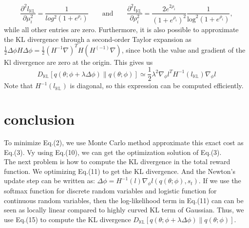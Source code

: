 \documentclass{article}
\begin{document}
	\begin{equation}
	\frac{\partial^2l_\mathds{KL}}{\partial\mu_i^2} = \frac{1}{log^2(1+e^{\rho_i})}\quad\quad\text{and}\quad\quad\frac{\partial^2l_\mathds{KL}}{\partial\rho_i^2} = \frac{2e^{2\rho_i}}{(1 + e^{\rho_i})^2}\frac{1}{\text{log}^2(1+e^{\rho_i})},
	\end{equation}
	while all other entries are zero. Furthermore, it is also possible to approximate the KL divergence through a second-order Taylor expansion as $\frac{1}{2}\Delta\phi H\Delta\phi=\frac{1}{2}(H^{-1}\nabla)^TH(H^(-1)\nabla)$, since both the value and gradient of the Kl divergence are zero at the origin. This gives us
	\begin{equation}
	D_\mathds{KL}[q(\theta;\phi + \lambda\Delta\phi)\|q(\theta;\phi)] \simeq \frac{1}{2}\lambda^2\nabla_\phi l^TH^{-1}(l_\mathds{KL})\nabla_\phi l
	\end{equation}
	Note that $H^{-1}(l_\mathds{KL})$ is diagonal, so this expression can be computed efficiently.
	\section{conclusion}
	To minimize Eq.(2), we use Monte Carlo method approximate this exact cost as Eq.(3). Vy using Eq.(10), we can get the optimization solution of Eq.(3).\\
	The next problem is how to compute the KL divergence in the total reward function. We optimizing Eq.(11) to get the KL divergence. And the Newton's update step can be written as: $\Delta{\phi} = H^{-1}(l)\nabla_\phi l(q(\theta;\phi),s_t).$ {\color{red} If we use the softmax function for discrete random variables and logistic function for continuous random variables,} then the log-likelihood term in Eq.(11) can can be seen as locally linear compared to highly curved KL term of Gaussian. Thus, we use Eq.(15) to compute the KL divergence $	D_\mathds{KL}[q(\theta;\phi + \lambda\Delta\phi)\|q(\theta;\phi)]$.
\end{document}

